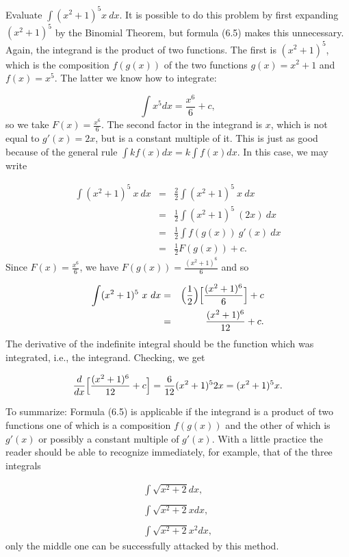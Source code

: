 \begin{example}
Evaluate $\int (x^2 + 1)^5 x\ dx$. It is possible to do this problem by first expanding $(x^2 + 1)^5$ by the Binomial Theorem, but formula (6.5) makes this unnecessary. Again, the integrand is the product of two functions. The first is $(x^2 + 1)^5$, which is the composition $f(g(x))$ of the two functions $g(x) = x^2 + 1$ and $f(x) = x^5$. The latter we know how to integrate:

$$
\int x^5 dx = \frac{x^6}{6} + c,
$$
\noindent so we take $F(x) = \frac{x^6}{6}$. The second factor in the integrand is $x$, which is not equal to $g'(x) = 2x$, but is a constant multiple of it. This is just as good because of the general rule $\int kf (x) dx = k \int f (x) dx$. In this case, we may write

\begin{eqnarray*}
\int (x^2 + 1)^{5}\ x\ dx &=& \frac{2}{2} \int (x^2 + 1)^{5}\ x\ dx \\
&=& \frac{1}{2} \int (x^2 + 1)^{5}\ (2x)\ dx \\
&=& \frac{1}{2} \int f(g(x))\ g'(x)\ dx\\
&=& \frac{1}{2}F(g(x)) + c.
\end{eqnarray*}
\noindent Since $F(x) = \frac{x^6}{6}$, we have $F(g(x)) = \frac{(x^2 + 1)^6}{6}$ and so 

\begin{eqnarray*}
\int (x^2 + 1 )^{5}\ x\ dx 
&=& \Bigl( \frac{1}{2} \Bigr) \Bigl[ \frac{(x^2 + 1)^6}{6} \Bigr] + c\\
&=& \frac{(x^2 + 1)^6}{12} + c.
\end{eqnarray*}
\noindent The derivative of the indefinite integral should be the function which was integrated, i.e., the integrand. Checking, we get

$$
\frac{d}{dx} \Bigl[ \frac{(x^2 + 1)^6}{12} + c \Bigr] = \frac{6}{12}(x^2 + 1)^{5} 2x = (x^2 + 1)^{5}x.
$$
\end{example}

To summarize: Formula (6.5) is applicable if the integrand is a product of two functions one of which is a composition $f(g(x))$ and the other of which is $g'(x)$ or possibly a constant multiple of $g'(x)$. With a little practice the
reader should be able to recognize immediately, for example, that of the three integrals   

$$
\begin{array}{l}
\int \sqrt{x^2 + 2}dx,\\
\\
\int \sqrt{x^2 + 2}xdx,\\
\\
\int \sqrt{x^2 + 2}x^2dx,
\end{array}
$$
\noindent only the middle one can be successfully attacked by this method.

